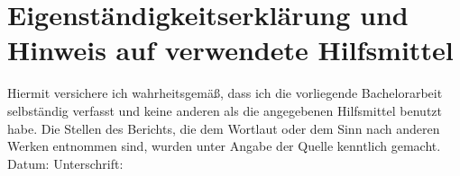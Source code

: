 \chapter*{Eigenständigkeitserklärung und Hinweis auf
verwendete Hilfsmittel}
\label{erklaerung}
Hiermit versichere ich wahrheitsgemäß, dass ich die vorliegende Bachelorarbeit selbständig verfasst und keine anderen als die angegebenen Hilfsmittel benutzt habe. Die Stellen des Berichts, die dem Wortlaut oder dem Sinn nach anderen Werken entnommen sind, wurden unter Angabe der Quelle kenntlich gemacht. 
\\[1.5cm]
Datum:	\hrulefill\enspace Unterschrift: \hrulefill
\\[3.5cm]


